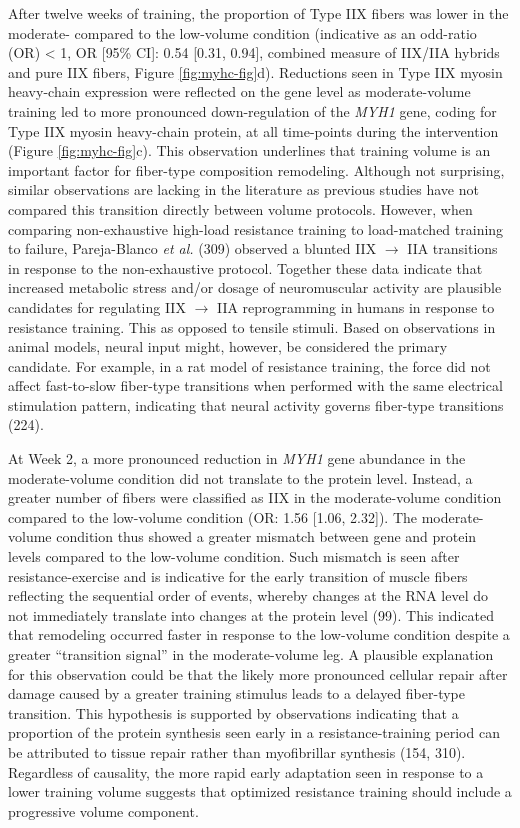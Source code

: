 \documentclass[twoside,10pt]{gihclass} %
\begin{document}
After twelve weeks of training, the proportion of Type IIX fibers was lower in the moderate- compared to the low-volume condition (indicative as an odd-ratio (OR) \textless{} 1, OR {[}95\% CI{]}: 0.54 {[}0.31, 0.94{]}, combined measure of IIX/IIA hybrids and pure IIX fibers, Figure \ref{fig:myhc-fig}d). Reductions seen in Type IIX myosin heavy-chain expression were reflected on the gene level as moderate-volume training led to more pronounced down-regulation of the \emph{MYH1} gene, coding for Type IIX myosin heavy-chain protein, at all time-points during the intervention (Figure \ref{fig:myhc-fig}c).
This observation underlines that training volume is an important factor for fiber-type composition remodeling. Although not surprising, similar observations are lacking in the literature as previous studies have not compared this transition directly between volume protocols.
However, when comparing non-exhaustive high-load resistance training to load-matched training to failure, Pareja-Blanco \emph{et al.}
(309)
observed a blunted IIX \(\rightarrow\) IIA transitions in response to the non-exhaustive protocol.
Together these data indicate that increased metabolic stress and/or dosage of neuromuscular activity are plausible candidates for regulating IIX \(\rightarrow\) IIA reprogramming in humans in response to resistance training.
This as opposed to tensile stimuli.
Based on observations in animal models, neural input might, however, be considered the primary candidate.
For example, in a rat model of resistance training, the force did not affect fast-to-slow fiber-type transitions when performed with the same electrical stimulation pattern, indicating that neural activity governs fiber-type transitions
(224).

At Week 2, a more pronounced reduction in \emph{MYH1} gene abundance in the moderate-volume condition did not translate to the protein level. Instead, a greater number of fibers were classified as IIX in the moderate-volume condition compared to the low-volume condition (OR: 1.56 {[}1.06, 2.32{]}).
The moderate-volume condition thus showed a greater mismatch between gene and protein levels compared to the low-volume condition.
Such mismatch is seen after resistance-exercise and is indicative for the early transition of muscle fibers reflecting the sequential order of events, whereby changes at the RNA level do not immediately translate into changes at the protein level
(99).
This indicated that remodeling occurred faster in response to the low-volume condition despite a greater ``transition signal'' in the moderate-volume leg.
A plausible explanation for this observation could be that the likely more pronounced cellular repair after damage caused by a greater training stimulus leads to a delayed fiber-type transition.
This hypothesis is supported by observations indicating that a proportion of the protein synthesis seen early in a resistance-training period can be attributed to tissue repair rather than myofibrillar synthesis
(154, 310).
Regardless of causality, the more rapid early adaptation seen in response to a lower training volume suggests that optimized resistance training should include a progressive volume component.
\end{document}
